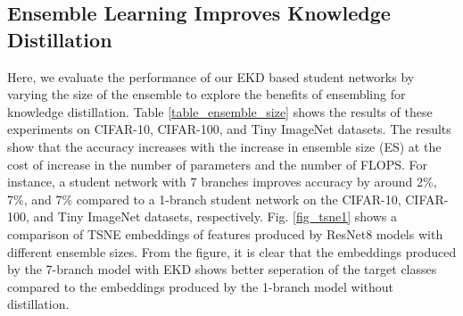 \documentclass{ecai}
\begin{document}
\subsection{Ensemble Learning Improves Knowledge Distillation}
Here, we evaluate the performance of our EKD based student networks by varying the size of the ensemble to explore the benefits of ensembling for knowledge distillation. Table \ref{table_ensemble_size} shows the results of these experiments on CIFAR-10, CIFAR-100, and Tiny ImageNet datasets. The results show that the accuracy increases with the increase in ensemble size (ES) at the cost of increase in the number of parameters and the number of FLOPS. For instance, a student network with 7 branches improves accuracy by around 2\%, 7\%, and 7\% compared to a 1-branch student network on the CIFAR-10, CIFAR-100, and Tiny ImageNet datasets, respectively. Fig. \ref{fig_tsne1} shows a comparison of TSNE embeddings of features produced by ResNet8 models with different ensemble sizes. From the figure, it is clear that the embeddings produced by the 7-branch model with EKD shows better seperation of the target classes compared to the embeddings produced by the 1-branch model without distillation.
\end{document}

